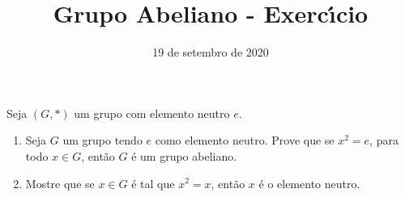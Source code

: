 \documentclass{beamer}
\title{Grupo Abeliano - Exerc{\'\i}cio}
\author[\autor]{\autor}
\institute[\instituto]{\instituto}
\date{19 de setembro de 2020}
\begin{document}
    \begin{frame}
        \maketitle
    \end{frame}


    \begin{frame}
        \begin{exercicio}
            Seja $(G,*)$ um grupo com elemento neutro $e$.
            \begin{enumerate}[label=({\alph*})]
                \item Seja $G$ um grupo tendo $e$ como elemento neutro. Prove que se
                $x^2 = e$, para todo $x\in G$, ent{\~a}o $G$ {\'e} um grupo abeliano.

                \item Mostre que se $x\in G$ {\'e} tal que $x^2 = x$, ent{\~a}o $x$ {\'e} o elemento neutro.
            \end{enumerate}
        \end{exercicio}
    \end{frame}
\end{document}
